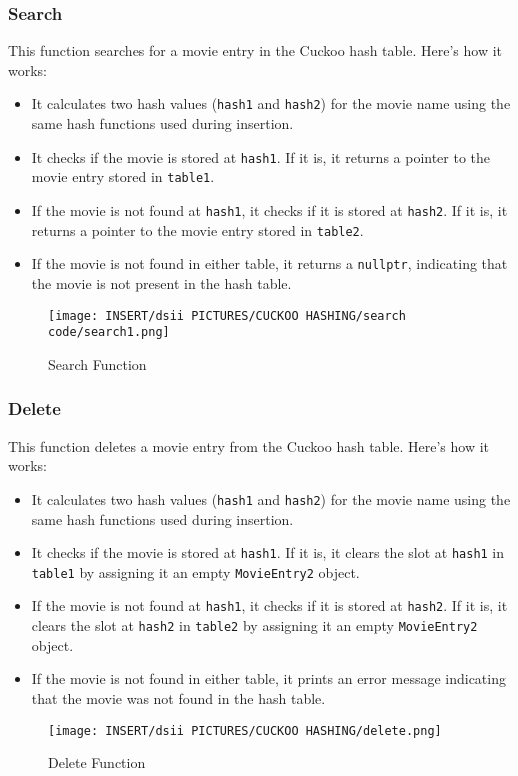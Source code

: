 \documentclass[12pt]{article}
\begin{document}
\subsubsection{Search}
This function searches for a movie entry in the Cuckoo hash table. Here's how it works:
\begin{itemize}
    \item It calculates two hash values (\texttt{hash1} and \texttt{hash2}) for the movie name using the same hash functions used during insertion.
    \item It checks if the movie is stored at \texttt{hash1}. If it is, it returns a pointer to the movie entry stored in \texttt{table1}.
    \item If the movie is not found at \texttt{hash1}, it checks if it is stored at \texttt{hash2}. If it is, it returns a pointer to the movie entry stored in \texttt{table2}.
    \item If the movie is not found in either table, it returns a \texttt{nullptr}, indicating that the movie is not present in the hash table.
\end{itemize}
\begin{figure}[htbp]
    \centering
    \texttt{[image: INSERT/dsii PICTURES/CUCKOO HASHING/search code/search1.png]}
    \caption{Search Function}
    \label{fig:insertion_step1}
\end{figure}

\newpage
\subsubsection{Delete}
This function deletes a movie entry from the Cuckoo hash table. Here's how it works:
\begin{itemize}
    \item It calculates two hash values (\texttt{hash1} and \texttt{hash2}) for the movie name using the same hash functions used during insertion.
    \item It checks if the movie is stored at \texttt{hash1}. If it is, it clears the slot at \texttt{hash1} in \texttt{table1} by assigning it an empty \texttt{MovieEntry2} object.
    \item If the movie is not found at \texttt{hash1}, it checks if it is stored at \texttt{hash2}. If it is, it clears the slot at \texttt{hash2} in \texttt{table2} by assigning it an empty \texttt{MovieEntry2} object.
    \item If the movie is not found in either table, it prints an error message indicating that the movie was not found in the hash table.
    
\end{itemize}
\begin{figure}[htbp]
    \centering
    \texttt{[image: INSERT/dsii PICTURES/CUCKOO HASHING/delete.png]}
    \caption{Delete Function}
    \label{fig:insertion_step1}
\end{figure}
\end{document}
